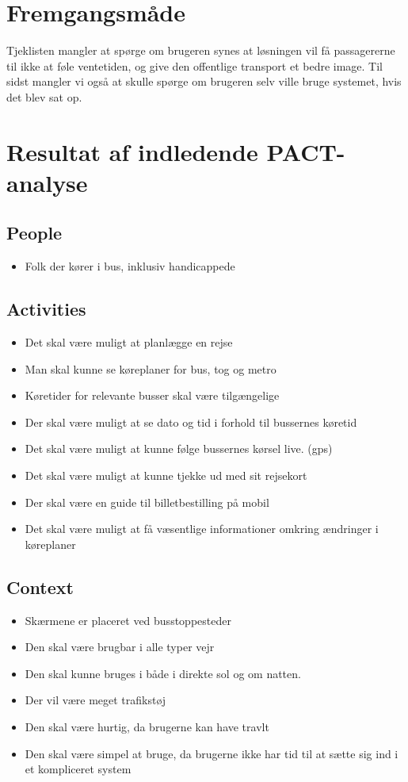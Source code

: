 \documentclass[12pt,a4paper,oneside]{article}
\author{Bertram A. Nicolas}
\begin{document}
\section{Fremgangsmåde}
Tjeklisten mangler at spørge om brugeren synes at løsningen vil få passagererne til ikke at føle ventetiden, og give den offentlige transport et bedre image.
Til sidst mangler vi også at skulle spørge om brugeren selv ville bruge systemet, hvis det blev sat op.
\section{Resultat af indledende PACT-analyse}
\subsection{People}
\begin{itemize}
\item Folk der kører i bus, inklusiv handicappede
\end{itemize}
\subsection{Activities}
\begin{itemize}
\item Det skal være muligt at planlægge en rejse
\item Man skal kunne se køreplaner for bus, tog og metro
\item Køretider for relevante busser skal være tilgængelige
\item Der skal være muligt at se dato og tid i forhold til bussernes køretid
\item Det skal være muligt at kunne følge bussernes kørsel live. (gps)
\item Det skal være muligt at kunne tjekke ud med sit rejsekort
\item Der skal være en guide til billetbestilling på mobil
\item Det skal være muligt at få væsentlige informationer omkring ændringer i køreplaner
\end{itemize}
\subsection{Context}
\begin{itemize}
\item Skærmene er placeret ved busstoppesteder
\item Den skal være brugbar i alle typer vejr
\item Den skal kunne bruges i både i direkte sol og om natten.
\item Der vil være meget trafikstøj
\item Den skal være hurtig, da brugerne kan have travlt
\item Den skal være simpel at bruge, da brugerne ikke har tid til at sætte sig ind i et kompliceret system
\end{itemize}
\end{document}
